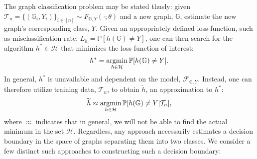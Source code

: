 \documentclass{article} %
\newcommand{\argmin}{\operatornamewithlimits{argmin}}
\newcommand{\PP}{\mathbb{P}}           %
\providecommand{\mc}[1]{\mathcal{#1}}
\providecommand{\mt}[1]{\widetilde{#1}}
\newcommand{\GG}{\mathbb{G}}
\begin{document}
The graph classification problem may be stated thusly: given $\mc{T}_n=\{(\GG_i,Y_i)\}_{i \in [n]} \sim F_{\GG,Y}(\cdot; \theta)$ and a new graph, $\GG$, estimate the new graph's corresponding class, $Y$.  Given an appropriately defined loss-function, such as misclassification rate: $L_h=\PP[h(\GG) \neq Y]$, one can then search for the algorithm $h^* \in \mc{H}$ that minimizes the loss function of interest:
\begin{align}
	h^* = \argmin_{h \in \mc{H}} \PP[h(\GG) \neq Y].
\end{align}
In general, $h^*$ is unavailable and dependent on the model, $\mc{F}_{\GG,Y}$.  Instead, one can therefore utilize training data, $\mc{T}_n$, to obtain $\mt{h}$, an approximation to $h^*$:
\begin{align}
	\mt{h} \approx \argmin_{h \in \mc{H}} \PP[h(\GG) \neq Y | \mc{T}_n],
\end{align}
where $\approx$ indicates that in general, we will not be able to find the actual minimum in the set $\mc{H}$. Regardless, any approach necessarily estimates a decision boundary in the space of graphs separating them into two classes.  We consider a few distinct such approaches to constructing such a decision boundary:


\end{document}
